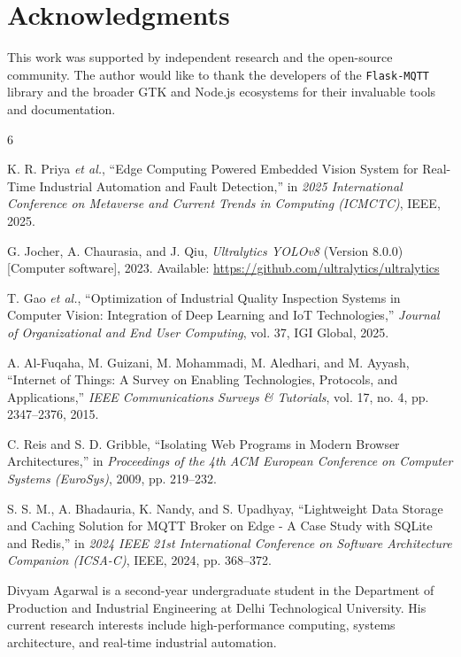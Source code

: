 \documentclass[lettersize,journal]{IEEEtran}
\begin{document}
\section*{Acknowledgments}
This work was supported by independent research and the open-source community. The author would like to thank the developers of the \texttt{Flask-MQTT} library and the broader GTK and Node.js ecosystems for their invaluable tools and documentation.

\begin{thebibliography}{6}


 K. R. Priya \textit{et al.}, ``Edge Computing Powered Embedded Vision System for Real-Time Industrial Automation and Fault Detection,'' in \textit{2025 International Conference on Metaverse and Current Trends in Computing (ICMCTC)}, IEEE, 2025.

 G. Jocher, A. Chaurasia, and J. Qiu, \textit{Ultralytics YOLOv8} (Version 8.0.0) [Computer software], 2023. Available: \url{https://github.com/ultralytics/ultralytics}

 T. Gao \textit{et al.}, ``Optimization of Industrial Quality Inspection Systems in Computer Vision: Integration of Deep Learning and IoT Technologies,'' \textit{Journal of Organizational and End User Computing}, vol. 37, IGI Global, 2025.

 A. Al-Fuqaha, M. Guizani, M. Mohammadi, M. Aledhari, and M. Ayyash, ``Internet of Things: A Survey on Enabling Technologies, Protocols, and Applications,'' \textit{IEEE Communications Surveys \& Tutorials}, vol. 17, no. 4, pp. 2347--2376, 2015.

 C. Reis and S. D. Gribble, ``Isolating Web Programs in Modern Browser Architectures,'' in \textit{Proceedings of the 4th ACM European Conference on Computer Systems (EuroSys)}, 2009, pp. 219--232.

 S. S. M., A. Bhadauria, K. Nandy, and S. Upadhyay, ``Lightweight Data Storage and Caching Solution for MQTT Broker on Edge - A Case Study with SQLite and Redis,'' in \textit{2024 IEEE 21st International Conference on Software Architecture Companion (ICSA-C)}, IEEE, 2024, pp. 368--372.

\end{thebibliography}

\vspace{11pt}

\begin{IEEEbiographynophoto}{Divyam Agarwal}
is a second-year undergraduate student in the Department of Production and Industrial Engineering at Delhi Technological University. His current research interests include high-performance computing, systems architecture, and real-time industrial automation.
\end{IEEEbiographynophoto}

\vfill
\end{document}
